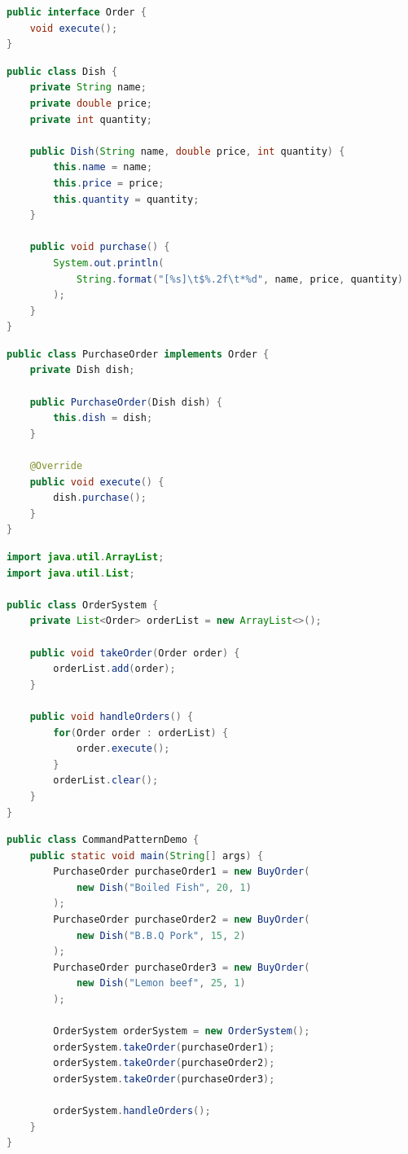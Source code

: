 \vspace{0.5cm}

\begin{lstlisting}[language=Java, title=Order.java]
public interface Order {
    void execute();
}
\end{lstlisting}

\begin{lstlisting}[language=Java, title=Dish.java]
public class Dish {
    private String name;
    private double price;
    private int quantity;

    public Dish(String name, double price, int quantity) {
        this.name = name;
        this.price = price;
        this.quantity = quantity;
    }

    public void purchase() {
        System.out.println(
            String.format("[%s]\t$%.2f\t*%d", name, price, quantity)
        );
    }
}
\end{lstlisting}

\begin{lstlisting}[language=Java, title=PurchaseOrder.java]
public class PurchaseOrder implements Order {
    private Dish dish;

    public PurchaseOrder(Dish dish) {
        this.dish = dish;
    }

    @Override
    public void execute() {
        dish.purchase();
    }
}
\end{lstlisting}

\begin{lstlisting}[language=Java, title=OrderSystem.java]
import java.util.ArrayList;
import java.util.List;

public class OrderSystem {
    private List<Order> orderList = new ArrayList<>();

    public void takeOrder(Order order) {
        orderList.add(order);
    }

    public void handleOrders() {
        for(Order order : orderList) {
            order.execute();
        }
        orderList.clear();
    }
}
\end{lstlisting}

\begin{lstlisting}[language=Java, title=CommandPatternDemo.java]
public class CommandPatternDemo {
    public static void main(String[] args) {
        PurchaseOrder purchaseOrder1 = new BuyOrder(
            new Dish("Boiled Fish", 20, 1)
        );
        PurchaseOrder purchaseOrder2 = new BuyOrder(
            new Dish("B.B.Q Pork", 15, 2)
        );
        PurchaseOrder purchaseOrder3 = new BuyOrder(
            new Dish("Lemon beef", 25, 1)
        );

        OrderSystem orderSystem = new OrderSystem();
        orderSystem.takeOrder(purchaseOrder1);
        orderSystem.takeOrder(purchaseOrder2);
        orderSystem.takeOrder(purchaseOrder3);

        orderSystem.handleOrders();
    }
}
\end{lstlisting}

